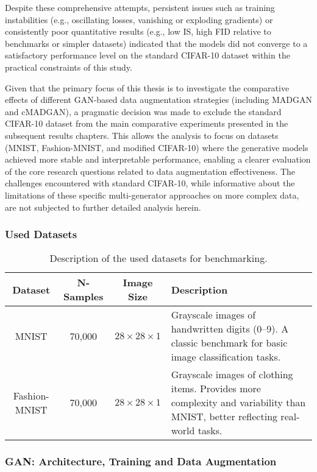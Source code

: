 Despite these comprehensive attempts, persistent issues such as training instabilities (e.g., oscillating losses, vanishing or exploding gradients) or consistently poor quantitative results (e.g., low IS, high FID relative to benchmarks or simpler datasets) indicated that the models did not converge to a satisfactory performance level on the standard CIFAR-10 dataset within the practical constraints of this study.

Given that the primary focus of this thesis is to investigate the comparative effects of different GAN-based data augmentation strategies (including MADGAN and cMADGAN), a pragmatic decision was made to exclude the standard CIFAR-10 dataset from the main comparative experiments presented in the subsequent results chapters. This allows the analysis to focus on datasets (MNIST, Fashion-MNIST, and modified CIFAR-10) where the generative models achieved more stable and interpretable performance, enabling a clearer evaluation of the core research questions related to data augmentation effectiveness. The challenges encountered with standard CIFAR-10, while informative about the limitations of these specific multi-generator approaches on more complex data, are not subjected to further detailed analysis herein.

\subsubsection{Used Datasets}

\begin{table}[H]
    \centering
    \begin{tabular}{|c|c|c|p{7.5cm}|}
        \hline
        Dataset & N-Samples & Image Size & Description \\ \hline
        MNIST & 70,000  & $28 \times 28 \times 1$ & Grayscale images of handwritten digits (0–9). A classic benchmark for basic image classification tasks.\\ \hline
        Fashion-MNIST & 70,000  & $28 \times 28 \times 1$ & Grayscale images of clothing items. Provides more complexity and variability than MNIST, better reflecting real-world tasks.\\ \hline
    \end{tabular}
    \caption{Description of the used datasets for benchmarking.}
    \label{exp_setup_used_datasets}
\end{table}



\subsubsection{GAN: Architecture, Training and Data Augmentation}

